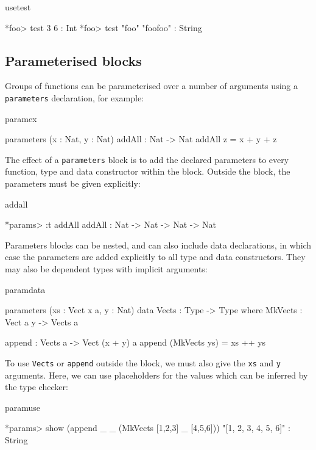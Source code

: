 \begin{SaveVerbatim}{usetest}

*foo> test 3 
6 : Int
*foo> test "foo" 
"foofoo" : String

\end{SaveVerbatim}

\subsection{Parameterised blocks}

Groups of functions can be parameterised over a number of arguments using a
\texttt{parameters} declaration, for example:

\begin{SaveVerbatim}{paramex}

parameters (x : Nat, y : Nat)
    addAll : Nat -> Nat
    addAll z = x + y + z

\end{SaveVerbatim}

\noindent
The effect of a \texttt{parameters} block is to add the declared parameters to every
function, type and data constructor within the block. Outside the block, the parameters
must be given explicitly:

\begin{SaveVerbatim}{addall}

*params> :t addAll
addAll : Nat -> Nat -> Nat -> Nat

\end{SaveVerbatim}

\noindent
Parameters blocks can be nested, and can also include data declarations, in
which case the parameters are added explicitly to all type and data
constructors. They may also be dependent types with implicit arguments:

\begin{SaveVerbatim}{paramdata}

parameters (xs : Vect x a, y : Nat)
    data Vects : Type -> Type where
         MkVects : Vect a y -> Vects a
  
    append : Vects a -> Vect (x + y) a
    append (MkVects ys) = xs ++ ys

\end{SaveVerbatim}

\noindent
To use \texttt{Vects} or \texttt{append} outside the block, we must also
give the \texttt{xs} and \texttt{y} arguments. Here, we can use placeholders for
the values which can be inferred by the type checker:

\begin{SaveVerbatim}{paramuse}

*params> show (append _ _ (MkVects [1,2,3] _ [4,5,6]))
"[1, 2, 3, 4, 5, 6]" : String

\end{SaveVerbatim}
